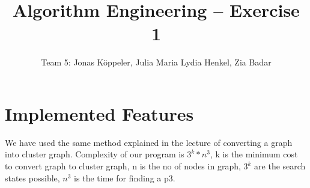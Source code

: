 \documentclass[5p,twocolumn,final]{elsarticle}
\begin{document}
\begin{frontmatter}
	\title{Algorithm Engineering -- Exercise 1}
	\author{Team 5: Jonas Köppeler, Julia Maria Lydia Henkel, Zia Badar}
\end{frontmatter}

\linenumbers

\section{Implemented Features}
We have used  the same method explained in the lecture of converting a graph into cluster graph. Complexity of our program is $3^{k}*n^{3}$,
k is the minimum cost to convert graph to cluster graph, n is the no of nodes in graph, $3^{k}$ are the search states possible, $n^{3}$ is the time
for finding a p3.
\end{document}
